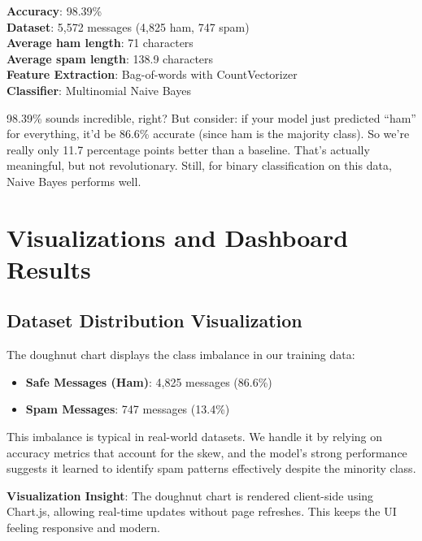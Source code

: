 \documentclass[12pt, a4paper]{article}
\begin{document}
\begin{highlight}
    \textbf{Accuracy}: 98.39\% \\
    \textbf{Dataset}: 5,572 messages (4,825 ham, 747 spam) \\
    \textbf{Average ham length}: 71 characters \\
    \textbf{Average spam length}: 138.9 characters \\
    \textbf{Feature Extraction}: Bag-of-words with CountVectorizer \\
    \textbf{Classifier}: Multinomial Naive Bayes
\end{highlight}

\begin{devnote}
    98.39\% sounds incredible, right? But consider: if your model just predicted ``ham'' for everything, it'd be 86.6\% accurate (since ham is the majority class). So we're really only 11.7 percentage points better than a baseline. That's actually meaningful, but not revolutionary. Still, for binary classification on this data, Naive Bayes performs well.
\end{devnote}

\section{Visualizations and Dashboard Results}

\subsection{Dataset Distribution Visualization}

The doughnut chart displays the class imbalance in our training data:

\begin{itemize}
    \item \textbf{Safe Messages (Ham)}: 4,825 messages (86.6\%)
    \item \textbf{Spam Messages}: 747 messages (13.4\%)
\end{itemize}

This imbalance is typical in real-world datasets. We handle it by relying on accuracy metrics that account for the skew, and the model's strong performance suggests it learned to identify spam patterns effectively despite the minority class.

\begin{highlight}
    \textbf{Visualization Insight}: The doughnut chart is rendered client-side using Chart.js, allowing real-time updates without page refreshes. This keeps the UI feeling responsive and modern.
\end{highlight}
\end{document}
